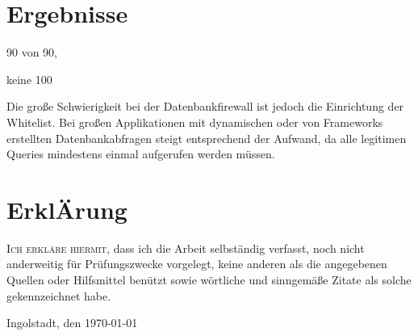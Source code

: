 \chapter{Ergebnisse}

90 von 90,

keine 100%

Die große Schwierigkeit bei der Datenbankfirewall ist jedoch die Einrichtung der Whitelist. Bei großen Applikationen mit dynamischen oder von Frameworks erstellten Datenbankabfragen steigt entsprechend der Aufwand, da alle legitimen Queries mindestens einmal aufgerufen werden müssen.

\printbibliography


\chapter*{Erkl{\huge Ä}rung}
\lettrine{I}{ch erkläre hiermit,} dass ich die Arbeit selbständig verfasst, noch nicht anderweitig für Prüfungszwecke vorgelegt, keine anderen als die angegebenen Quellen oder Hilfsmittel benützt sowie wörtliche und sinngemäße Zitate als solche gekennzeichnet habe.

\vspace{3\baselineskip}
\noindent Ingolstadt, den \today

\par\noindent\makebox[2.5in]{} \hfill{}%
\\[-1cm]




